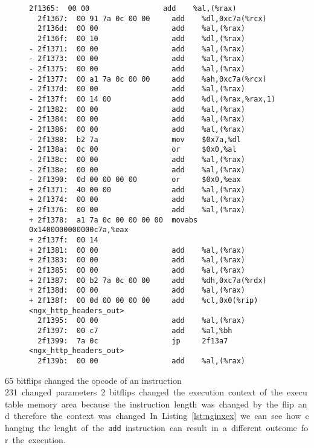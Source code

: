 \begin{figure}
\begin{minipage}{\linewidth}
\begin{lstlisting}[style=diff,
                   caption={Diff of the disassembly for a bitflip applied to
the \texttt{nginx} binary in order to bypass the credential check. The
\texttt{add} instruction is prefixed with a \texttt{0x40}, which is the Intel
REX prefix used to change addressing modes. This prefix changes the computation
before the jump to \texttt{ngx\_http\_headers\_out} at address
\texttt{0x2f1399}.},
label=lst:nginxex]
  2f1365:  00 00                 add    %al,(%rax)
  2f1367:  00 91 7a 0c 00 00     add    %dl,0xc7a(%rcx)
  2f136d:  00 00                 add    %al,(%rax)
  2f136f:  00 10                 add    %dl,(%rax)
- 2f1371:  00 00                 add    %al,(%rax)
- 2f1373:  00 00                 add    %al,(%rax)
- 2f1375:  00 00                 add    %al,(%rax)
- 2f1377:  00 a1 7a 0c 00 00     add    %ah,0xc7a(%rcx)
- 2f137d:  00 00                 add    %al,(%rax)
- 2f137f:  00 14 00              add    %dl,(%rax,%rax,1)
- 2f1382:  00 00                 add    %al,(%rax)
- 2f1384:  00 00                 add    %al,(%rax)
- 2f1386:  00 00                 add    %al,(%rax)
- 2f1388:  b2 7a                 mov    $0x7a,%dl
- 2f138a:  0c 00                 or     $0x0,%al
- 2f138c:  00 00                 add    %al,(%rax)
- 2f138e:  00 00                 add    %al,(%rax)
- 2f1390:  0d 00 00 00 00        or     $0x0,%eax
+ 2f1371:  40 00 00              add    %al,(%rax)
+ 2f1374:  00 00                 add    %al,(%rax)
+ 2f1376:  00 00                 add    %al,(%rax)
+ 2f1378:  a1 7a 0c 00 00 00 00  movabs 0x1400000000000c7a,%eax
+ 2f137f:  00 14
+ 2f1381:  00 00                 add    %al,(%rax)
+ 2f1383:  00 00                 add    %al,(%rax)
+ 2f1385:  00 00                 add    %al,(%rax)
+ 2f1387:  00 b2 7a 0c 00 00     add    %dh,0xc7a(%rdx)
+ 2f138d:  00 00                 add    %al,(%rax)
+ 2f138f:  00 0d 00 00 00 00     add    %cl,0x0(%rip)  <ngx_http_headers_out>
  2f1395:  00 00                 add    %al,(%rax)
  2f1397:  00 c7                 add    %al,%bh
  2f1399:  7a 0c                 jp     2f13a7  <ngx_http_headers_out>
  2f139b:  00 00                 add    %al,(%rax)
\end{lstlisting}
\end{minipage}
\end{figure}

\num{65} bitflips changed the opcode of an instruction \SI{231} changed
parameters. \num{2} bitflips changed the execution context of the executable
memory area because the instruction length was changed by the flip and
therefore the context was changed. In Listing~\ref{lst:nginxex} we can see how
changing the lenght of the \texttt{add} instruction can result in a different
outcome for the execution.

